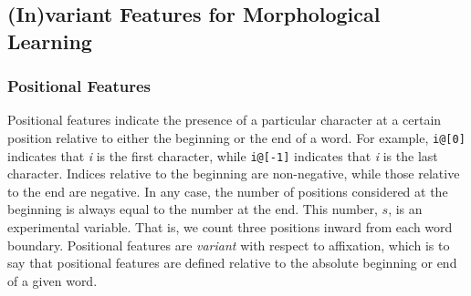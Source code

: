 

\subsection{(In)variant Features for Morphological Learning}

\subsubsection{Positional Features}
Positional features
indicate the presence of a particular
character at a certain position relative to either the beginning or the end of 
a word. For example, \texttt{i@[0]} indicates that \textit{i} is the first 
character, while \texttt{i@[-1]} indicates that \textit{i} is the last character. 
Indices relative to the beginning are non-negative, while those relative 
to the end are negative. In any case, the number of positions considered 
at the beginning is always equal to the number at the end. This number, 
$s$, is an experimental variable.
That is, we count three positions inward from each word boundary.
Positional features are \emph{variant} 
with respect to affixation, which is to say that positional features are 
defined relative to the absolute beginning 
or end of a given word. 

